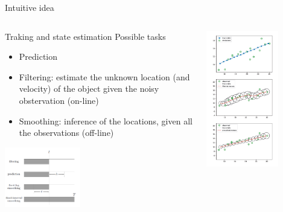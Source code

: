 \documentclass[11pt]{beamer}
\begin{document}
\begin{frame}{Intuitive idea \cite{pml2Book}}
\small
\begin{columns}
\begin{column}{0.5\textwidth}
\begin{alertblock}{Traking and state estimation}
Possible tasks 
\begin{itemize}
\item Prediction
\item Filtering: estimate the unknown location (and velocity) of the object given the noisy obstervation (on-line)
\item Smoothing: inference of the locations, given all the observations (off-line)
\end{itemize}
\end{alertblock}
    \begin{center}
     \includegraphics[width=0.4\textwidth]{Pic/schema.png}
     \end{center}
\end{column}
\begin{column}{0.5\textwidth}  %
    \begin{center}
     \includegraphics[width=0.7\textwidth]{Pic/Kalman_rec.png}

\end{center}
\end{column}
\end{columns}
\end{frame}
\end{document}
